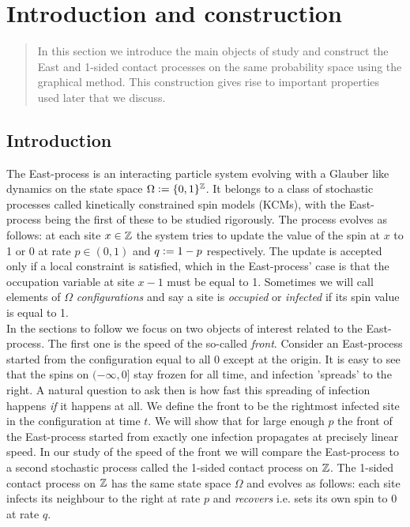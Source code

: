\section{Introduction and construction}\label{dec:introduction}
\label{sec:basic_coupling}

\begin{quote}
{\small In this section we introduce the main objects of study and construct the East and 1-sided contact processes on the same probability space using the graphical method. This construction gives rise to important properties used later that we discuss. }
\end{quote}

\subsection{Introduction}\label{ssec:introduction}
The East-process is an interacting particle system evolving with a Glauber like dynamics on the state space $\Omega \vcentcolon= \{0,1\}^{\mathbb{Z}}$. It belongs to a class of stochastic processes called kinetically constrained spin models (KCMs), with the East-process being the first of these to be studied rigorously. The process evolves as follows: at each site $x \in \mathbb{Z}$ the system tries to update the value of the spin at $x$ to 1 or 0 at rate $p \in (0,1)$ and $q \vcentcolon= 1 - p$ respectively. The update is accepted only if a local constraint is satisfied, which in the East-process' case is that the occupation variable at site $x-1$ must be equal to 1. Sometimes we will call elements of $\Omega$ \textit{configurations} and say a site is \textit{occupied} or \textit{infected} if its spin value is equal to 1. \\

In the sections to follow we focus on two objects of interest related to the East-process. The first one is the speed of the so-called \textit{front}. Consider an East-process started from the configuration equal to all 0 except at the origin. It is easy to see that the spins on $(-\infty, 0]$ stay frozen for all time, and infection 'spreads' to the right. A natural question to ask then is how fast this spreading of infection happens \textit{if} it happens at all. We define the front to be the rightmost infected site in the configuration at time $t$. We will show that for large enough $p$ the front of the East-process started from exactly one infection propagates at precisely linear speed. In our study of the speed of the front we will compare the East-process to a second stochastic process called the 1-sided contact process on $\mathbb{Z}$. The 1-sided contact process on $\mathbb{Z}$ has the same state space $\Omega$ and evolves as follows: each site infects its neighbour to the right at rate $p$ and \textit{recovers} i.e. sets its own spin to 0 at rate $q$. \\

